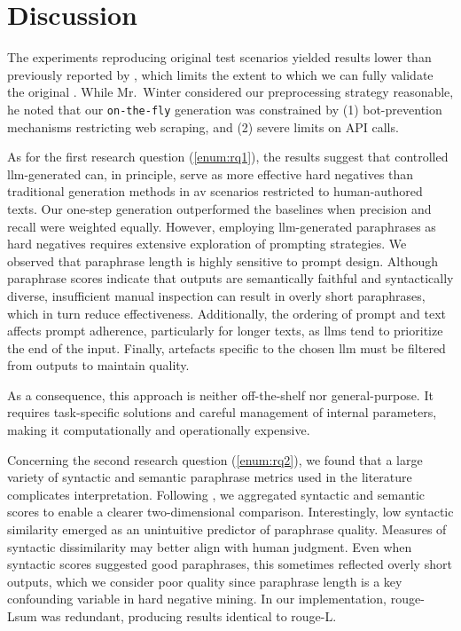 \chapter{Discussion}
\label{chap:discussion}

The experiments reproducing original test scenarios yielded results lower than previously reported by \citet{koppel_determining_2014}, which limits the extent to which we can fully validate the original \impAppr{}. 
While Mr.~Winter considered our preprocessing strategy reasonable, he noted that our \texttt{on-the-fly} \imp{} generation was constrained by (1) bot-prevention mechanisms restricting web scraping, and (2) severe limits on API calls.  

As for the first research question (\ref{enum:rq1}), the results suggest that controlled \ac{llm}-generated \imps{} can, in principle, serve as more effective hard negatives than traditional \imp{} generation methods in \ac{av} scenarios restricted to human-authored texts. 
Our one-step \imp{} generation outperformed the baselines when precision and recall were weighted equally.  
However, employing \ac{llm}-generated paraphrases as hard negatives requires extensive exploration of prompting strategies.  
We observed that paraphrase length is highly sensitive to prompt design. 
Although paraphrase scores indicate that outputs are semantically faithful and syntactically diverse, insufficient manual inspection can result in overly short paraphrases, which in turn reduce \impAppr{} effectiveness.  
Additionally, the ordering of prompt and text affects prompt adherence, particularly for longer texts, as \acp{llm} tend to prioritize the end of the input.  
Finally, artefacts specific to the chosen \ac{llm} must be filtered from outputs to maintain quality. 

As a consequence, this approach is neither off-the-shelf nor general-purpose. 
It requires task-specific solutions and careful management of internal parameters, making it computationally and operationally expensive.


Concerning the second research question (\ref{enum:rq2}), we found that a large variety of syntactic and semantic paraphrase metrics used in the literature complicates interpretation. 
Following \citet{gohsen_captions_2023}, we aggregated syntactic and semantic scores to enable a clearer two-dimensional comparison.  
Interestingly, low syntactic similarity emerged as an unintuitive predictor of paraphrase quality. 
Measures of syntactic dissimilarity may better align with human judgment.  
Even when syntactic scores suggested good paraphrases, this sometimes reflected overly short outputs, which we consider poor quality since paraphrase length is a key confounding variable in hard negative mining.  
In our implementation, \ac{rouge}-Lsum was redundant, producing results identical to \ac{rouge}-L.  

